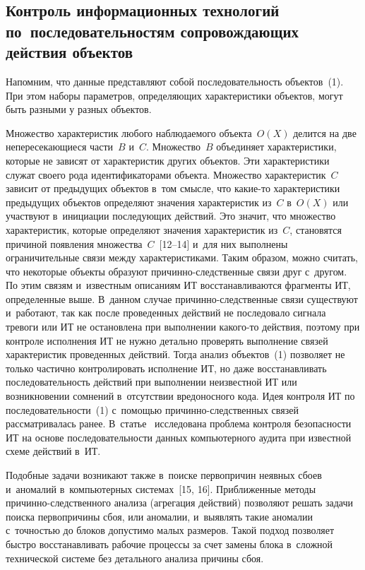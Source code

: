 \begin{multicols}{2}
  
  \section{Контроль информационных технологий по~последовательностям сопровождающих 
действия объектов }
  
  Напомним, что данные представляют собой последовательность объектов~(1). 
При этом наборы па\-ра\-мет\-ров, определяющих характеристики объектов, могут 
быть разными у разных объектов.
  
  Множество характеристик любого наблюдаемого объекта~$O(X)$ делится на 
две непересекающиеся части~$B$ и~$C$. Множество~$B$ объединяет 
характеристики, которые не зависят от характеристик других объектов. Эти 
характеристики служат своего рода идентификаторами объекта. Множество 
характеристик~$C$ зависит от предыдущих объектов в~том смыс\-ле, что  
ка\-кие-то характеристики предыдущих объектов определяют значения 
характеристик из~$C$ в~$O(X)$ или участвуют в~инициации последующих 
действий. Это значит, что множество характеристик, которые определяют 
значения характеристик из~$C$, становятся причиной появления множества~$C$~[12--14] и~для них выполнены ограничительные связи между 
характеристиками. Таким образом, можно считать, что некоторые объекты 
образуют при\-чин\-но-след\-ст\-вен\-ные связи друг с~другом. По этим связям 
и~известным описаниям ИТ восстанавливаются фрагменты ИТ, определенные 
выше. В~данном случае при\-чин\-но-след\-ст\-вен\-ные связи существуют 
и~работают, так как после проведенных действий не последовало сигнала тревоги 
или ИТ не остановлена при выполнении ка\-ко\-го-то действия, поэтому при 
контроле исполнения ИТ не нужно детально проверять выполнение связей 
характеристик проведенных действий. Тогда анализ объектов~(1) позволяет не 
только частично контролировать исполнение ИТ, но даже восстанавливать 
последовательность действий при выполнении неизвестной ИТ или 
возникновении сомнений в~отсутствии вредоносного кода. Идея контроля ИТ по 
последовательности~(1) с~по\-мощью при\-чин\-но-след\-ст\-вен\-ных связей 
рассматривалась ранее. В~\mbox{статье}~\cite{15-gr} исследована проблема контроля 
безопас\-ности ИТ на основе последовательности данных 
компьютерного аудита при известной схеме действий в~ИТ.
   
  Подобные задачи возникают также в~поиске первопричин неявных сбоев 
и~аномалий в~компьютерных сис\-те\-мах~[15, 16]. Приближенные методы  
при\-чин\-но-след\-ст\-вен\-но\-го анализа (агрегация действий) позволяют решать 
задачи поиска первопричины сбоя, или аномалии, и~выявлять такие аномалии 
с~точностью до блоков допустимо малых размеров. Такой подход позволяет 
быстро восстанавливать рабочие процессы за счет замены блока в~сложной 
технической системе без детального анализа причины сбоя.


\end{multicols}
